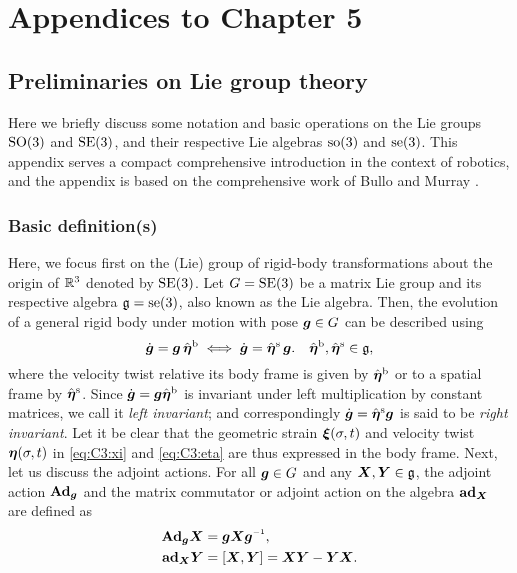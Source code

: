 \chapter{Appendices to Chapter 5}
\vspace{-10mm}
\section{Preliminaries on Lie group theory} 
\label{app:C3:liegroup}
Here we briefly discuss some notation and basic operations on the Lie groups $\textup{\textrm{SO}}(3)$ and $\textup{\textrm{SE}}(3)$, and their respective Lie algebras $\textup{\textrm{so}}(3)$ and $\textup{\textrm{se}}(3)$. This appendix serves a compact comprehensive introduction in the context of robotics, and the appendix is based on the comprehensive work of Bullo and Murray \cite{Bullo1995}.

\subsection{Basic definition(s)}
Here, we focus first on the (Lie) group of rigid-body transformations about the origin of $\mathbb{R}^3$ denoted by $\textup{\textrm{SE}}(3)$. Let $G = \textup{\textrm{SE}}(3)$ be a matrix Lie group and its respective algebra $\mathfrak{g} = \textup{\textrm{se}}(3)$, also known as the Lie algebra. Then, the evolution of a general rigid body under motion with pose ${\boldsymbol{g}} \in G$ can be described using 
%
\begin{equation}
\dot{{\boldsymbol{g}}} = {\boldsymbol{g}}\, \hat{{\boldsymbol{\eta}}}^{\textrm{b}} \;  \Longleftrightarrow  \; \dot{{\boldsymbol{g}}} = \hat{{\boldsymbol{\eta}}}^{\textrm{s}}\,{\boldsymbol{g}}. \quad \hat{{\boldsymbol{\eta}}}^{\textrm{b}},\hat{{\boldsymbol{\eta}}}^{\textrm{s}} \in \mathfrak{g},
\end{equation}
%
where the velocity twist relative its body frame is given by $\hat{{\boldsymbol{\eta}}}^\textrm{b}$ or to a spatial frame by $\hat{{\boldsymbol{\eta}}}^\textrm{s}$. Since $\dot{{\boldsymbol{g}}} = {\boldsymbol{g}} \hat{{\boldsymbol{\eta}}}^{\textrm{b}}$ is invariant under left multiplication by constant matrices, we call it \textit{left invariant}; and correspondingly $\dot{{\boldsymbol{g}}} = \hat{{\boldsymbol{\eta}}}^{\textrm{s}} {\boldsymbol{g}} $ is said to be \textit{right invariant}. Let it be clear that the geometric strain ${\boldsymbol{\xi}}(\sigma,t)$ and velocity twist ${\boldsymbol{\eta}}(\sigma,t)$ in \eqref{eq:C3:xi} and \eqref{eq:C3:eta} are thus expressed in the body frame. Next, let us discuss the adjoint actions. For all ${\boldsymbol{g}} \in G$ and any ${\boldsymbol{X}},{\boldsymbol{Y}} \in \mathfrak{g}$, the adjoint action $\textbf{Ad}_{{\boldsymbol{g}}}$ and the matrix commutator or adjoint action on the algebra $\textbf{ad}_{{\boldsymbol{X}}}$ are defined as 
%
\begin{align}
\Ad_{\gB} \XB & = \gB \XB \gB \inv \label{eq:C3:A1:adjoint1},\\
\ad_{\XB} \YB & = \left[\XB,\YB\right]  = \XB \YB - \YB\XB. \label{eq:C3:A1:adjoint2}
\end{align}
